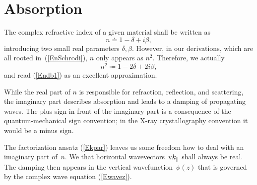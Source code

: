 

%
\fi

\section{Absorption}\label{Sabsorption}

%
%
The complex refractive index of a given material
shall be written as
\begin{equation}\label{Endb1}
  n\doteq 1-\delta +i\beta,  
\end{equation}
%
%
introducing two small real parameters $\delta, \beta$.
However, 
in our derivations, which are all rooted in~(\ref{EnSchrodi}),
$n$ only appears as $n^2$. 
Therefore, we actually 
\begin{equation}\label{Endb2}
  n^2\coloneqq 1-2\delta+2i\beta,
\end{equation}
and read (\ref{Endb1}) as an excellent approximation.

While the real part of $n$ is responsible for refraction, reflection,
and scattering,
the imaginary part describes absorption
and leads to a damping of propagating waves.
The plus sign in front of the imaginary part is a consequence of
the quantum-mechanical sign convention;
in the X-ray crystallography convention it would be a minus sign.
%

The factorization ansatz (\ref{Ekpar}) leaves us some freedom
how to deal with an imaginary part of~$n$.
We  that horizontal wavevectors~$\text{v}{k}_\parallel$
shall always be real.
The damping then appears in the vertical wavefunction~$\phi(z)$
that is governed by the complex wave equation (\ref{Ewavez}).

%
